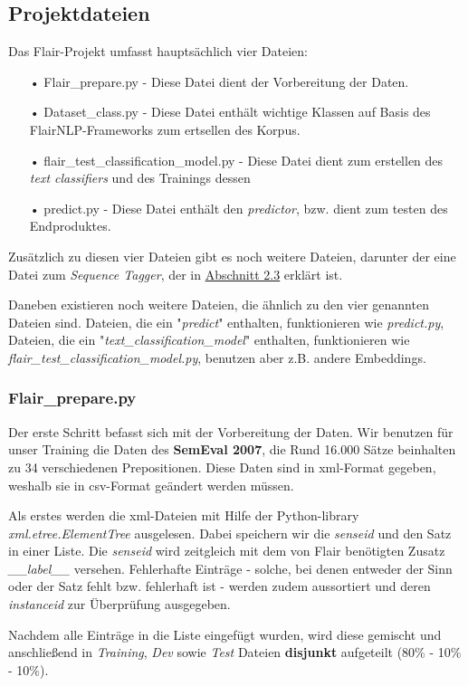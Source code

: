 \documentclass[10pt,a4paper]{article}
\begin{document}
\subsection{Projektdateien}
\begin{flushleft}
Das Flair-Projekt umfasst hauptsächlich vier Dateien:
\end{flushleft}
\begin{itemize}
\item[•] Flair\_prepare.py - Diese Datei dient der Vorbereitung der Daten.
\item[•] Dataset\_class.py - Diese Datei enthält wichtige Klassen auf Basis des FlairNLP-Frameworks zum ertsellen des Korpus.
\item[•] flair\_test\_classification\_model.py - Diese Datei dient zum erstellen des \textit{text classifiers} und des Trainings dessen
\item[•] predict.py - Diese Datei enthält den \textit{predictor}, bzw. dient zum testen des Endproduktes.
\end{itemize}
\begin{flushleft}
Zusätzlich zu diesen vier Dateien gibt es noch weitere Dateien, darunter der eine Datei zum \textit{Sequence Tagger}, der in \hyperlink{SeqTag}{Abschnitt 2.3} erklärt ist.

Daneben existieren noch weitere Dateien, die ähnlich zu den vier genannten Dateien sind. Dateien, die ein "\textit{predict}" enthalten, funktionieren wie \textit{predict.py}, Dateien, die ein "\textit{text\_classification\_model}" enthalten, funktionieren wie \textit{flair\_test\_classification\_model.py}, benutzen aber z.B. andere Embeddings.
\end{flushleft}

\subsubsection{Flair\_prepare.py}
\begin{flushleft}
Der erste Schritt befasst sich mit der Vorbereitung der Daten. Wir benutzen für unser Training die Daten des \textbf{SemEval 2007}, die Rund 16.000 Sätze beinhalten zu 34 verschiedenen Prepositionen. Diese Daten sind in xml-Format gegeben, weshalb sie in csv-Format geändert werden müssen.

Als erstes werden die xml-Dateien mit Hilfe der Python-library \textit{xml.etree.ElementTree} ausgelesen. Dabei speichern wir die \textit{senseid} und den Satz in einer Liste. Die \textit{senseid} wird zeitgleich mit dem von Flair benötigten Zusatz \textit{\_\_label\_\_} versehen. Fehlerhafte Einträge - solche, bei denen entweder der Sinn oder der Satz fehlt bzw. fehlerhaft ist - werden zudem aussortiert und deren \textit{instanceid} zur Überprüfung ausgegeben.

Nachdem alle Einträge in die Liste eingefügt wurden, wird diese gemischt und anschließend in \textit{Training}, \textit{Dev} sowie \textit{Test} Dateien \textbf{disjunkt} aufgeteilt (80\% - 10\% - 10\%).
\end{flushleft}
\end{document}

